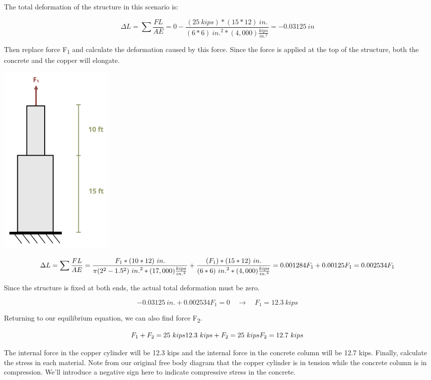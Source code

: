 \documentclass[
  letterpaper,
  DIV=11,
  numbers=noendperiod]{scrreprt}
\begin{document}
\begin{tcolorbox}
\begin{tcolorbox}
The total deformation of the structure in this scenario is:

\[
\Delta L=\sum \frac{F L}{A E}=0-\frac{(25{~kips}) *(15 * 12){~in.}}{(6 * 6){~in.}^2 *(4,000)\frac{kips}{in.^2}}=-0.03125{~in}
\]

Then replace force F\textsubscript{1} and calculate the deformation
caused by this force. Since the force is applied at the top of the
structure, both the concrete and the copper will elongate.

\begin{center}
\includegraphics[width=2.1875in,height=\textheight]{images/PNGs/Example 5.5 part 4.png}
\end{center}

\[
\Delta L=\sum \frac{F L}{A E}=\frac{F_1 *(10 * 12){~in.}}{\pi(2^2-1.5^2){~in.}^2 *(17,000)\frac{kips}{in.^2}}+\frac{\left(F_1\right) *(15 * 12){~in.}}{(6 * 6){~in.}^2 *(4,000)\frac{kips}{in.^2}} \\
=0.001284F_1+0.00125 F_1 \\
=0.002534 F_1
\]

Since the structure is fixed at both ends, the actual total deformation
must be zero.

\[
-0.03125{~in.}+0.002534 F_1=0 \quad\rightarrow\quad F_1=12.3{~kips}
\]

Returning to our equilibrium equation, we can also find force
F\textsubscript{2}.

\[
F_1+F_2=25{~kips} \\
12.3{~kips}+F_2=25{~kips} \\
F_2=12.7{~kips}
\]

The internal force in the copper cylinder will be 12.3 kips and the
internal force in the concrete column will be 12.7 kips. Finally,
calculate the stress in each material. Note from our original free body
diagram that the copper cylinder is in tension while the concrete column
is in compression. We'll introduce a negative sign here to indicate
compressive stress in the concrete.


\end{tcolorbox}
\end{tcolorbox}
\end{document}

